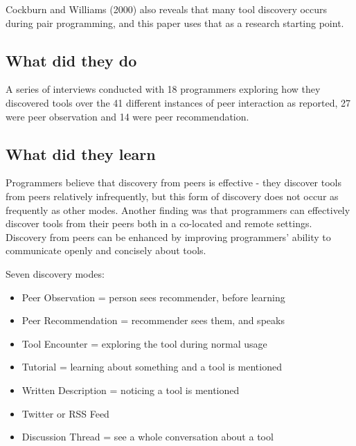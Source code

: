 Cockburn and Williams (2000)\cite{cockburnCostsBenefitsPair2001} also reveals that many tool discovery occurs during pair programming, and this paper uses that as a research starting point.

\subsection{What did they do}

A series of interviews conducted with 18 programmers exploring how they discovered tools over the 41 different instances of peer interaction as reported, 27 were peer observation and 14 were peer recommendation.

\subsection{What did they learn}

Programmers believe that discovery from peers is effective - they discover tools from peers relatively infrequently, but this form of discovery does not occur as frequently as other modes. Another finding was that programmers can effectively discover tools from their peers both in a co-located and remote settings. Discovery from peers can be enhanced by improving programmers' ability to communicate openly and concisely about tools.

Seven discovery modes:

\begin{itemize}
    \item Peer Observation = person sees recommender, before learning
    \item Peer Recommendation = recommender sees them, and speaks
    \item Tool Encounter = exploring the tool during normal usage
    \item Tutorial = learning about something and a tool is mentioned
    \item Written Description = noticing a tool is mentioned
    \item Twitter or RSS Feed
    \item Discussion Thread = see a whole conversation about a tool
\end{itemize}
